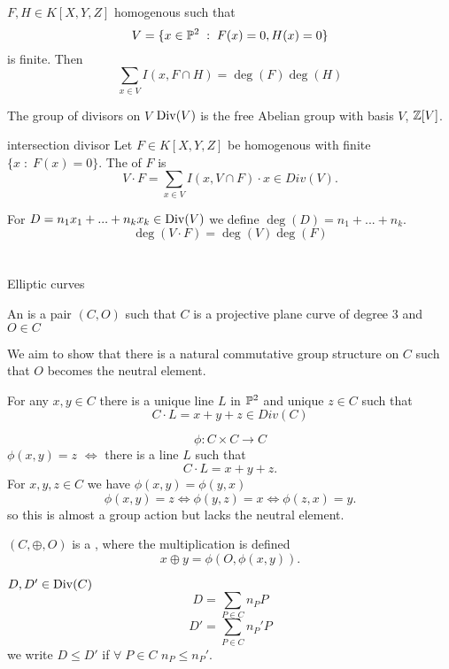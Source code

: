 \documentclass[twoside, a4paper, 12pt]{book}
\begin{document}
\begin{theorem}{}{}
  $F,H\in K[X,Y,Z]$ homogenous such that 
  $$V=\{x\in \mathbb{P}^2\;:\;F(x)=0, H(x)=0\}$$
  is finite. Then
  $$\sum_{x\in V}I(x, F\cap H)=\deg(F)\deg(H)$$
\end{theorem}

The group of divisors on $V$ $\operatorname{Div}(V)$ is the free Abelian group with basis $V$, $\mathbb{Z}[V]$.
\begin{definition}{intersection divisor}{}
  Let $F\in K[X,Y,Z]$ be homogenous with finite $\{x\;:\;F(x)=0\}$. The  of $F$ is
  $$V\cdot F=\sum_{x\in V}I(x, V\cap F)\cdot x\in Div(V).$$
\end{definition}

For $D=n_1x_1+...+n_kx_k\in \operatorname{Div}(V)$ we define $\deg(D)=n_1+...+n_k$.
$$\deg(V\cdot F)=\deg(V)\deg(F)$$

\section{}{Elliptic curves}

\begin{definition}{}{}
  An  is a pair $(C, O)$ such that $C$ is a projective plane curve of degree $3$ and $O\in C$
\end{definition}

We aim to show that there is a natural commutative group structure on $C$ such that $O$ becomes the neutral element.

\begin{lemma}{}{}
  For any $x,y\in C$ there is a unique line $L$ in $\mathbb{P}^2$ and unique $z\in C$ such that 
  $$C\cdot L=x+y+z\in Div(C)$$
\end{lemma}

$$\phi:C\times C\to C$$
$\phi(x, y)=z$ $\iff$ there is a line $L$ such that
$$C\cdot L=x+y+z.$$
For $x,y,z\in C$ we have $\phi(x,y)=\phi(y,x)$
$$\phi(x,y)=z\iff \phi(y,z)=x\iff \phi(z, x)=y.$$
so this is almost a group action but lacks the neutral element.

\begin{theorem}{}{}
  $(C, \oplus, O)$ is a , where the multiplication is defined
  $$x\oplus y=\phi(O, \phi(x,y)).$$
\end{theorem}

\begin{definition}{}{}
  $D,D'\in\operatorname{Div}(C)$
  $$D=\sum_{P\in C}n_PP$$
  $$D'=\sum_{P\in C}n_P'P$$
  we write $D\leq D'$ if $\forall\;P\in C$ $n_P\leq n_P'$.
\end{definition}
\end{document}

